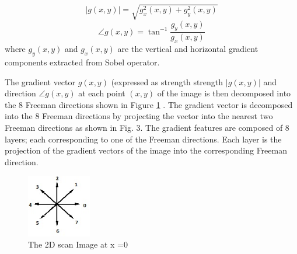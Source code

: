 \documentclass[conference]{IEEEtran}
\begin{document}
\begin{equation}
|g(x,y)|=\sqrt{g^{2}_{x}(x,y)+g^{2}_{y}(x,y)}
\label{eq:1}
\end{equation}
\begin{equation}
\angle g(x,y)=\tan^{-1} \frac{g_{y}(x,y)}{g_{x}(x,y)}
\label{eq:2}
\end{equation}
where $g_{y}(x,y)$ and $g_{x}(x,y)$ are the vertical and horizontal gradient components extracted from Sobel operator.

The gradient vector $g(x,y)$ (expressed as strength strength $|g(x,y)|$ and direction $\angle g(x,y)$  at each point $(x,y)$ of the image is then decomposed into the 8 Freeman\cite{gonzales2002} directions shown in Figure \ref{fig:freeman} . The gradient vector is decomposed into the 8 Freeman directions by projecting the vector into the nearest two Freeman directions as shown in Fig. 3.
The gradient features are composed of 8 layers; each corresponding to one of the Freeman directions. Each layer is the projection of the gradient vectors of the image into the corresponding Freeman direction.

 \begin{figure}
\centering
\label{fig:freeman}
\includegraphics[width=0.25\textwidth]{images/freemanCodes.jpg}
 \caption{The 2D scan Image at x =0 }
\end{figure}


%
%
\end{document}
